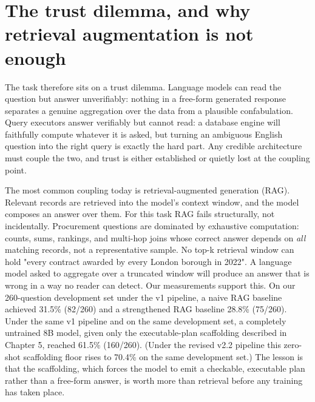 \section{The trust dilemma, and why retrieval augmentation is not enough}\label{sec:the-trust-dilemma-and-why-retrieval-augm}

The task therefore sits on a trust dilemma. Language models can read the question but answer unverifiably: nothing in a free-form generated response separates a genuine aggregation over the data from a plausible confabulation. Query executors answer verifiably but cannot read: a database engine will faithfully compute whatever it is asked, but turning an ambiguous English question into the right query is exactly the hard part. Any credible architecture must couple the two, and trust is either established or quietly lost at the coupling point.

The most common coupling today is retrieval-augmented generation (RAG). Relevant records are retrieved into the model's context window, and the model composes an answer over them. For this task RAG fails structurally, not incidentally. Procurement questions are dominated by exhaustive computation: counts, sums, rankings, and multi-hop joins whose correct answer depends on \emph{all} matching records, not a representative sample. No top-k retrieval window can hold "every contract awarded by every London borough in 2022". A language model asked to aggregate over a truncated window will produce an answer that is wrong in a way no reader can detect. Our measurements support this. On our 260-question development set under the v1 pipeline, a naive RAG baseline achieved 31.5\% (82/260) and a strengthened RAG baseline 28.8\% (75/260). Under the same v1 pipeline and on the same development set, a completely untrained 8B model, given only the executable-plan scaffolding described in Chapter 5, reached 61.5\% (160/260). (Under the revised v2.2 pipeline this zero-shot scaffolding floor rises to 70.4\% on the same development set.) The lesson is that the scaffolding, which forces the model to emit a checkable, executable plan rather than a free-form answer, is worth more than retrieval before any training has taken place.


